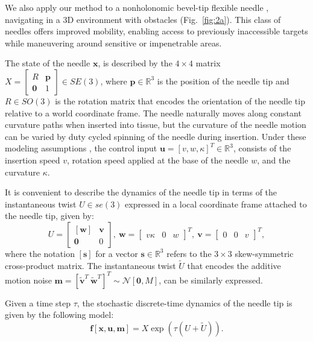 We also apply our method to a nonholonomic bevel-tip flexible needle \cite{Cowan2011_Chapter}, navigating in a 3D environment with obstacles (Fig.\ \ref{fig:2a}). This class of needles offers improved mobility,
enabling access to previously inaccessible targets while maneuvering around sensitive or impenetrable areas.

The state of the needle $\mathbf{x}$, is described by the $4 \times 4$ matrix $X = \left[\begin{smallmatrix} R & \mathbf{p} \\ \mathbf{0} & 1 \end{smallmatrix} \right] \in SE(3)$, where $\mathbf{p} \in \mathbb{R}^3$ is the position of the needle tip and $R \in SO(3)$ is the rotation matrix that encodes the orientation of the needle tip relative to a world coordinate frame. The needle naturally moves along constant curvature paths when inserted into tissue, but the curvature of the needle motion can be varied by duty cycled spinning of the needle during insertion. Under these modeling assumptions \cite{vandenBerg10_WAFR}, the control input $\mathbf{u} = [v, w, \kappa]^T \in \mathbb{R}^3$, consists of the insertion speed $v$, rotation speed applied at the base of the needle $w$, and the curvature $\kappa$.

It is convenient to describe the dynamics of the needle tip in terms of the instantaneous twist $U \in se(3)$ expressed in a local coordinate frame attached to the needle tip, given by:
\begin{equation}
U = \begin{bmatrix} [\mathbf{w}] & \mathbf{v} \\ \mathbf{0} & 0 \end{bmatrix}, ~ \mathbf{w} = \begin{bmatrix} v\kappa & 0 & w \end{bmatrix}^T, ~ \mathbf{v} = \begin{bmatrix} 0 & 0 & v \end{bmatrix}^T,
\end{equation}
where the notation $[\mathbf{s}]$ for a vector $\mathbf{s} \in \mathbb{R}^3$ refers to the $3 \times 3$ skew-symmetric cross-product matrix. The instantaneous twist $\tilde{U}$ that encodes the additive motion noise $\mathbf{m} = [\tilde{\mathbf{v}}^T ~ \tilde{\mathbf{w}}^T]^T \sim  \mathcal{N}[\mathbf{0}, M]$, can be similarly expressed.

Given a time step $\tau$, the stochastic discrete-time dynamics of the needle tip is given by the following model:
\begin{equation}
\mathbf{f}[\mathbf{x}, \mathbf{u}, \mathbf{m}] = X\exp(\tau (U + \tilde{U})).
\end{equation}

